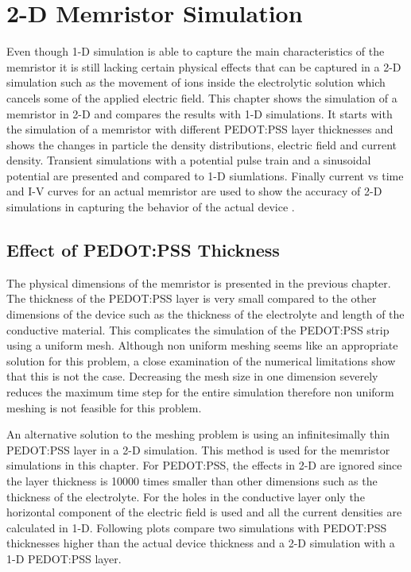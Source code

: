 
\chapter{2-D Memristor Simulation} %

\label{Chapter7} %

\begin{doublespace}

Even though 1-D simulation is able to capture the main characteristics of the memristor it is still lacking certain physical effects that can be captured in a 2-D simulation such as the movement of ions inside the electrolytic solution which cancels some of the applied electric field. This chapter shows the simulation of a memristor in 2-D and compares the results with 1-D simulations. It starts with the simulation of a memristor with different PEDOT:PSS layer thicknesses and shows the changes in particle the density distributions, electric field and current density. Transient simulations with a potential pulse train and a sinusoidal potential are presented and compared to 1-D siumlations. Finally current vs time and I-V curves for an actual memristor are used to show the accuracy of 2-D simulations in capturing the behavior of the actual device .  

\section{Effect of PEDOT:PSS Thickness}

The physical dimensions of the memristor is presented in the previous chapter. The thickness of the PEDOT:PSS layer is very small compared to the other dimensions of the device such as the thickness of the electrolyte and length of the conductive material. This complicates the simulation of the PEDOT:PSS strip using a uniform mesh. Although non uniform meshing seems like an appropriate solution for this problem, a close examination of the numerical limitations show that this is not the case. Decreasing the mesh size in one dimension severely reduces the maximum time step for the entire simulation therefore non uniform meshing is not feasible for this problem. 

An alternative solution to the meshing problem is using an infinitesimally thin PEDOT:PSS layer in a 2-D simulation. This method is used for the memristor simulations in this chapter. For PEDOT:PSS, the effects in 2-D are ignored since the layer thickness is 10000 times smaller than other dimensions such as the thickness of the electrolyte. For the holes in the conductive layer only the horizontal component of the electric field is used and all the current densities are calculated in 1-D. Following plots compare two simulations with PEDOT:PSS thicknesses higher than the actual device thickness and a 2-D simulation with a 1-D PEDOT:PSS layer.  


\end{doublespace}
